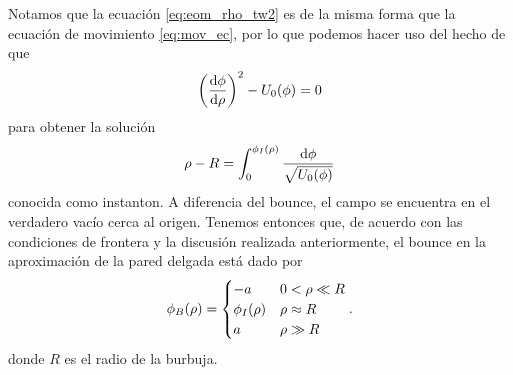 Notamos que la ecuación \eqref{eq:eom_rho_tw2} es de la misma forma que la ecuación de movimiento \eqref{eq:mov_ec}, por lo que podemos hacer uso del hecho de que 
\begin{equation}
\qty(\dv{\phi}{\rho})^2 - U_0\qty(\phi) = 0
\end{equation} 
para obtener la solución 
\begin{equation}
\rho - R = \int_0^{\phi_I \qty(\rho)} \frac{\dd{\phi}}{\sqrt{U_0\qty(\phi)}}
\end{equation}
conocida como instanton. A diferencia del bounce, 
 el campo se encuentra en el verdadero vacío cerca al origen. 
Tenemos entonces que, de acuerdo con las condiciones de frontera y la discusión realizada anteriormente, 
el bounce en la aproximación de la pared delgada está dado por
\begin{equation} \label{eq:bounce_tw}
\phi_B \qty(\rho) = \begin{cases}
-a & 0 < \rho \ll R \\
\phi_I \qty(\rho) & \rho \approx R \\
a & \rho \gg R
\end{cases}.
\end{equation}
donde $R$ es el radio de la burbuja. 

